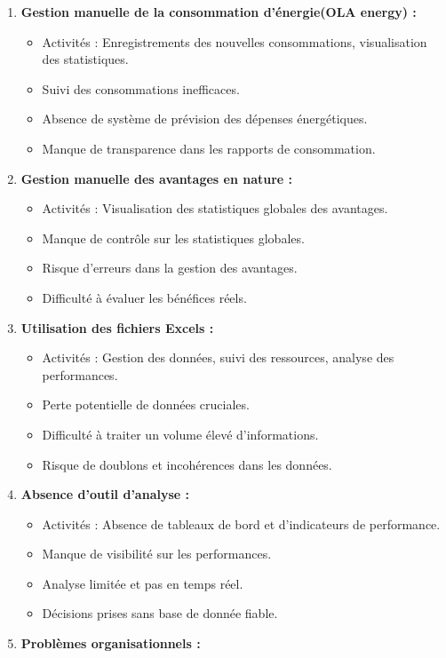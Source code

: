 \documentclass[a4paper,11pt]{report}
\begin{document}
\begin{enumerate}
\item \textbf{Gestion manuelle de la consommation d'énergie(OLA energy) : } \nopagebreak[4]
\begin{itemize}
	\item Activités : Enregistrements des nouvelles consommations, visualisation des statistiques.
	\item Suivi des consommations inefficaces.
	\item Absence de système de prévision des dépenses énergétiques.
	\item Manque de transparence dans les rapports de consommation.
\end{itemize}
\item \textbf{Gestion manuelle des avantages en nature : }
\begin{itemize}
	\item Activités : Visualisation des statistiques globales des avantages.
	\item Manque de contrôle sur les statistiques globales.
	\item Risque d'erreurs dans la gestion des avantages.
	\item Difficulté à évaluer les bénéfices réels.
\end{itemize}
\item \textbf{Utilisation des fichiers Excels : }
\begin{itemize}
	\item Activités : Gestion des données, suivi des ressources, analyse des performances.
	\item Perte potentielle de données cruciales.
	\item Difficulté à traiter un volume élevé d'informations.
	\item Risque de doublons et incohérences dans les données.
\end{itemize}

\item \textbf{Absence d'outil d'analyse : }
\begin{itemize}
	\item Activités : Absence de tableaux de bord et d'indicateurs de performance.
	\item Manque de visibilité sur les performances.
	\item Analyse limitée et pas en temps réel.
	\item Décisions prises sans base de donnée fiable.
\end{itemize}

\item \textbf{Problèmes organisationnels :}


\end{enumerate}
\end{document}
